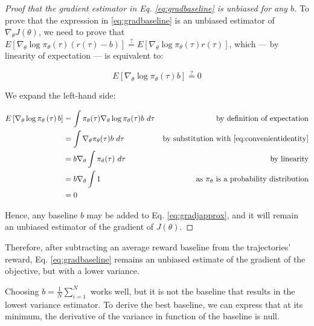 \documentclass{article}
\begin{document}
\begin{proof}[Proof that the gradient estimator in Eq. \eqref{eq:gradbaseline} is unbiased for any $b$]

  To prove that the expression in \eqref{eq:gradbaseline} is an unbiased estimator of $ \nabla_\theta J(\theta)$, we need to prove that $E\left[\nabla_\theta\log\pi_\theta\left(\tau\right)\left(r\left(\tau\right)-b\right)\right]\overset{?}{=}E\left[\nabla_\theta\log\pi_\theta\left(\tau\right)r\left(\tau\right)\right]$, which — by linearity of expectation — is equivalent to:

  \begin{equation}
    E\left[\nabla_\theta\log\pi_\theta\left(\tau\right)b\right] \overset{?}{=} 0
  \end{equation}

  We expand the left-hand side:

  \begin{subequations}\label{eq:proofunbiasedgrad}
    \begin{align}
      E\left[\nabla_\theta\log\pi_\theta\left(\tau\right)b\right]
        &= \int \pi_{\theta}(\tau) \nabla_{\theta} \log \pi_{\theta}(\tau) b\ d\tau &\text{by definition of expectation} \label{eq:proofunbiasedgradstart}\\
        &= \int \nabla_{\theta}\pi_{\theta}(\tau) b\ d\tau &\text{by substitution with \eqref{eq:convenientidentity}}\\ 
        &= b\nabla_{\theta}\int \pi_{\theta}(\tau)\ d\tau &\text{by linearity} \\
        &= b\nabla_{\theta}\int 1 &\text{as }\pi_\theta\text{ is a probability distribution} \\
        &= 0 \label{eq:proofunbiasedgradend}
    \end{align}
  \end{subequations}

  Hence, any baseline $b$ may be added to Eq. \eqref{eq:gradjapprox}, and it will remain an unbiased estimator of the gradient of $J(\theta)$.
\end{proof}

Therefore, after subtracting an average reward baseline from the trajectories' reward, Eq. \eqref{eq:gradbaseline} remains an unbiased estimate of the gradient of the objective, but with a lower variance.

Choosing $b=\frac{1}{N} \sum_{i=1}^{N}$ works well, but it is not the baseline that results in the lowest variance estimator. To derive the best baseline, we can express that at its minimum, the derivative of the variance in function of the baseline is null.
\end{document}
